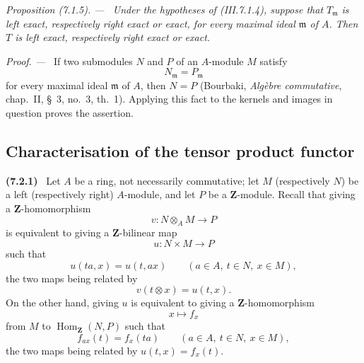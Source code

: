 \documentclass[10pt,oneside]{book}
\newcommand{\bb}[1]{\mathbf{#1}}
\newcommand{\Hom}{\operatorname{Hom}}
\newcommand{\sref}[2][]{(#2)}
\newcommand{\oldpage}[2][]{\setcounter{footnote}{0}\marginpar{\scriptsize\textbf{#1}~|~#2}\ignorespaces}
\newenvironment{env}[1][]{\par\medskip\noindent\textbf{(#1)}\ }{\par}
\newenvironment{proposition}[1][]{\par\medskip\noindent\itshape Proposition (#1). ---\ }{\par}
\newenvironment{proof}{\par\medskip\noindent\textit{Proof. ---\ }}{\par}
\begin{document}
\begin{proposition}[7.1.5]
\label{III.7.1.5}
Under the hypotheses of \sref{III.7.1.4}, suppose that
$T_{\mathfrak m}$ is left exact, respectively right exact or
exact, for every maximal ideal $\mathfrak m$ of $A$.  Then $T$
is left exact, respectively right exact or exact.
\end{proposition}

\begin{proof}
If two submodules $N$ and $P$ of an $A$-module $M$ satisfy
\[
  N_{\mathfrak m}=P_{\mathfrak m}
\]
for every maximal ideal $\mathfrak m$ of $A$, then $N=P$
(Bourbaki, \emph{Alg\`ebre commutative}, chap.~II, \S~3,
no.~3, th.~1).  Applying this fact to the kernels and images in
question proves the assertion.
\end{proof}

\subsection{Characterisation of the tensor product functor}
\label{subsection:III.7.2}

\begin{env}[7.2.1]
\label{III.7.2.1}
Let $A$ be a ring, not necessarily commutative; let $M$
(respectively $N$) be a left (respectively right) $A$-module,
and let $P$ be a $\bb Z$-module.  Recall that giving a
$\bb Z$-homomorphism
\[
  v:N\otimes_A M\longrightarrow P
\]
is equivalent to giving a $\bb Z$-bilinear map
\[
  u:N\times M\longrightarrow P
\]
such that
\[
  u(ta,x)=u(t,ax)
  \qquad(a\in A,\ t\in N,\ x\in M),
\]
the two maps being related by
\[
  v(t\otimes x)=u(t,x).
\]
On the other hand, giving $u$ is equivalent to giving a
\oldpage[III]{177}
$\bb Z$-homomorphism
\[
  x\longmapsto f_x
\]
from $M$ to $\Hom_{\bb Z}(N,P)$ such that
\[
  f_{ax}(t)=f_x(ta)
  \qquad(a\in A,\ t\in N,\ x\in M),
\]
the two maps being related by $u(t,x)=f_x(t)$.
\end{env}
\end{document}
